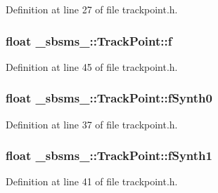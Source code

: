 Definition at line 27 of file trackpoint.\+h.

\subsubsection[{\texorpdfstring{f}{f}}]{\setlength{\rightskip}{0pt plus 5cm}float \+\_\+sbsms\+\_\+\+::\+Track\+Point\+::f\hspace{0.3cm}{\ttfamily [protected]}}\hypertarget{class__sbsms___1_1_track_point_a6e6b4b8a6a49334d10529fa6246506e0}{}\label{class__sbsms___1_1_track_point_a6e6b4b8a6a49334d10529fa6246506e0}


Definition at line 45 of file trackpoint.\+h.

\subsubsection[{\texorpdfstring{f\+Synth0}{fSynth0}}]{\setlength{\rightskip}{0pt plus 5cm}float \+\_\+sbsms\+\_\+\+::\+Track\+Point\+::f\+Synth0}\hypertarget{class__sbsms___1_1_track_point_a969e3b568426e0293b39b1d2746ce645}{}\label{class__sbsms___1_1_track_point_a969e3b568426e0293b39b1d2746ce645}


Definition at line 37 of file trackpoint.\+h.

\subsubsection[{\texorpdfstring{f\+Synth1}{fSynth1}}]{\setlength{\rightskip}{0pt plus 5cm}float \+\_\+sbsms\+\_\+\+::\+Track\+Point\+::f\+Synth1}\hypertarget{class__sbsms___1_1_track_point_ad7700dbd8aaa0686b44e673e5bdbfc1e}{}\label{class__sbsms___1_1_track_point_ad7700dbd8aaa0686b44e673e5bdbfc1e}


Definition at line 41 of file trackpoint.\+h.

